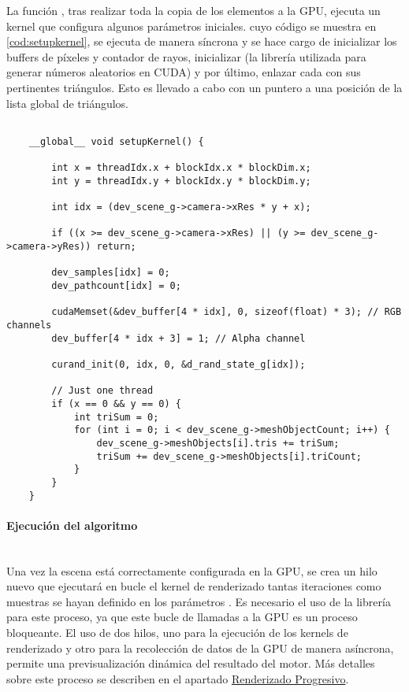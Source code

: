 La función , tras realizar toda la copia de los elementos a la GPU, ejecuta un kernel que configura algunos parámetros iniciales.  cuyo código se muestra en \autoref{cod:setupkernel}, se ejecuta de manera síncrona y se hace cargo de inicializar los buffers de píxeles y contador de rayos, inicializar  (la librería utilizada para generar números aleatorios en CUDA) y por último, enlazar cada  con sus pertinentes triángulos. Esto es llevado a cabo con un puntero a una posición de la lista global de triángulos.


\begin{minipage}[c]{0.95\textwidth}
\begin{lstlisting}[label={cod:setupkernel}, caption={Kernel de configuración inicial}]
	
	__global__ void setupKernel() {

		int x = threadIdx.x + blockIdx.x * blockDim.x;
		int y = threadIdx.y + blockIdx.y * blockDim.y;

		int idx = (dev_scene_g->camera->xRes * y + x);

		if ((x >= dev_scene_g->camera->xRes) || (y >= dev_scene_g->camera->yRes)) return;

		dev_samples[idx] = 0;
		dev_pathcount[idx] = 0;

		cudaMemset(&dev_buffer[4 * idx], 0, sizeof(float) * 3); // RGB channels
		dev_buffer[4 * idx + 3] = 1; // Alpha channel

		curand_init(0, idx, 0, &d_rand_state_g[idx]);

		// Just one thread
		if (x == 0 && y == 0) {
			int triSum = 0;
			for (int i = 0; i < dev_scene_g->meshObjectCount; i++) {
				dev_scene_g->meshObjects[i].tris += triSum;
				triSum += dev_scene_g->meshObjects[i].triCount;
			}
		}
	}
\end{lstlisting}
\end{minipage}

\paragraph{Ejecución del algoritmo}\mbox{} \\

Una vez la escena está correctamente configurada en la GPU, se crea un hilo nuevo que ejecutará en bucle el kernel de renderizado tantas iteraciones como muestras se hayan definido en los parámetros . Es necesario el uso de la librería  para este proceso, ya que este bucle de llamadas a la GPU es un proceso bloqueante. El uso de dos hilos, uno para la ejecución de los kernels de renderizado y otro para la recolección de datos de la GPU de manera asíncrona, permite una previsualización dinámica del resultado del motor. Más detalles sobre este proceso se describen en el apartado \hyperref[progressiverender]{Renderizado Progresivo}.

